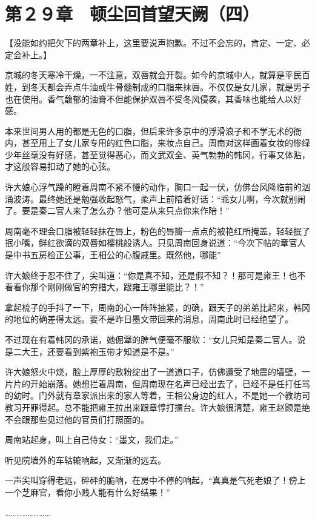 \section{第２９章　顿尘回首望天阙（四）}

【没能如约把欠下的两章补上，这里要说声抱歉。不过不会忘的，肯定、一定、必定会补上。】

京城的冬天寒冷干燥，一不注意，双唇就会开裂。如今的京城中人，就算是平民百姓，到冬天都会弄点牛油或牛骨髓制成的口脂来抹唇。不仅仅是女儿家，就是男子也在使用。香气馥郁的油膏不但能保护双唇不受冬风侵袭，其香味也能给人以好感。

本来世间男人用的都是无色的口脂，但后来许多京中的浮滑浪子和不学无术的衙内，甚至用上了女儿家专用的红色口脂，来妆点自己。周南对这样画着女妆的惨绿少年丝毫没有好感，甚至觉得恶心，而文武双全、英气勃勃的韩冈，行事又体贴，才这般容易扣动了她的心弦。

许大娘心浮气躁的瞪着周南不紧不慢的动作，胸口一起一伏，仿佛台风降临前的汹涌波涛。最终她还是勉强收起怒气，柔声上前陪着好话：“乖女儿啊，今次就别闹了。要是秦二官人来了怎么办？他可是从来只点你来作陪！”

周南毫不理会口脂被轻轻抹在唇上，粉色的唇瓣一点点的被艳红所掩盖，轻轻抿了抿小嘴，鲜红欲滴的双唇如樱桃般诱人。只见周南回身说道：“今次下帖的章官人是中书五房检正公事，王相公的心腹戚里。既然他，哪能”

许大娘终于忍不住了，尖叫道：“你是真不知，还是假不知？！那可是雍王！也不看看你那个刚刚做官的穷措大，跟雍王哪里能比？！”

拿起梳子的手抖了一下，周南的心一阵阵抽紧，的确，跟天子的弟弟比起来，韩冈的地位的确差得太远。要不是昨日墨文带回来的消息，周南此时已经绝望了。

不过现在有着韩冈的承诺，她倔犟的脾气便毫不服软：“女儿只知是秦二官人。说是二大王，还要看到紫袍玉带才知道是不是。”

许大娘怒火中烧，脸上厚厚的敷粉绽出了一道道口子，仿佛遭受了地震的墙壁，一片片的开始崩落。她想拦着周南，但周南现在名声已经出去了，已经不是任打任骂的幼时。门外就有章家派出来的家人等着，王相公身边的红人，不是她一个教坊司教习开罪得起。总不能把雍王拉出来跟章惇打擂台。许大娘很清楚，雍王赵颢是绝不会跟那些见过他的官员们打照面的。

周南站起身，叫上自己侍女：“墨文，我们走。”

听见院墙外的车轱辘响起，又渐渐的远去。

一声尖叫穿得老远，砰砰的脆响，在房中不停的响起，“真真是气死老娘了！傍上一个芝麻官，看你小贱人能有什么好结果！”

……………………

